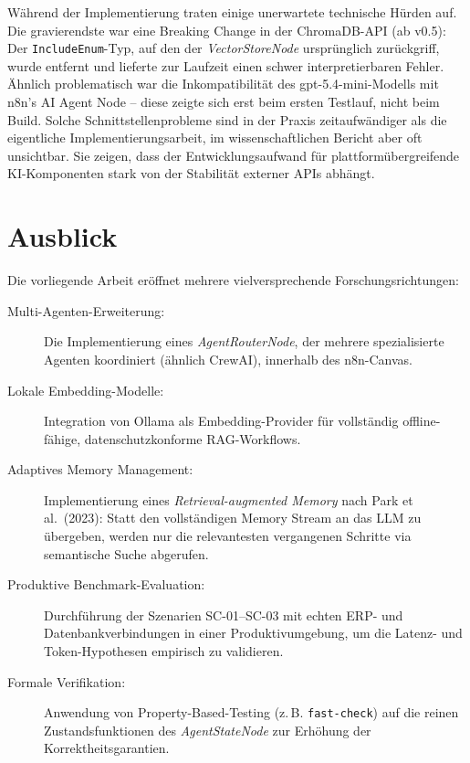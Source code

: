 \documentclass[12pt,a4paper,oneside]{report}
\begin{document}
Während der Implementierung traten einige unerwartete technische Hürden auf. Die
gravierendste war eine Breaking Change in der ChromaDB-API (ab v0.5): Der
\texttt{IncludeEnum}-Typ, auf den der \textit{VectorStoreNode} ursprünglich
zurückgriff, wurde entfernt und lieferte zur Laufzeit einen schwer interpretierbaren
Fehler. Ähnlich problematisch war die Inkompatibilität des gpt-5.4-mini-Modells mit
n8n's AI Agent Node -- diese zeigte sich erst beim ersten Testlauf, nicht beim Build.
Solche Schnittstellenprobleme sind in der Praxis zeitaufwändiger als die eigentliche
Implementierungsarbeit, im wissenschaftlichen Bericht aber oft unsichtbar. Sie zeigen,
dass der Entwicklungsaufwand für plattformübergreifende KI-Komponenten stark von der
Stabilität externer APIs abhängt.

\section{Ausblick}

Die vorliegende Arbeit eröffnet mehrere vielversprechende Forschungsrichtungen:

\begin{description}
  \item[Multi-Agenten-Erweiterung:] Die Implementierung eines
    \textit{AgentRouterNode}, der mehrere spezialisierte Agenten koordiniert
    (ähnlich CrewAI), innerhalb des n8n-Canvas.

  \item[Lokale Embedding-Modelle:] Integration von Ollama als Embedding-Provider für
    vollständig offline-fähige, datenschutzkonforme RAG-Workflows.

  \item[Adaptives Memory Management:] Implementierung eines \textit{Retrieval-augmented
    Memory} nach Park et al.\ (2023): Statt den vollständigen Memory Stream an das
    \ac{LLM} zu übergeben, werden nur die relevantesten vergangenen Schritte via
    semantische Suche abgerufen.

  \item[Produktive Benchmark-Evaluation:] Durchführung der Szenarien SC-01--SC-03
    mit echten ERP- und Datenbankverbindungen in einer Produktivumgebung, um die
    Latenz- und Token-Hypothesen empirisch zu validieren.

  \item[Formale Verifikation:] Anwendung von Property-Based-Testing (z.\,B.
    \texttt{fast-check}) auf die reinen Zustandsfunktionen des \textit{AgentStateNode}
    zur Erhöhung der Korrektheitsgaran\-tien.
\end{description}
\end{document}
